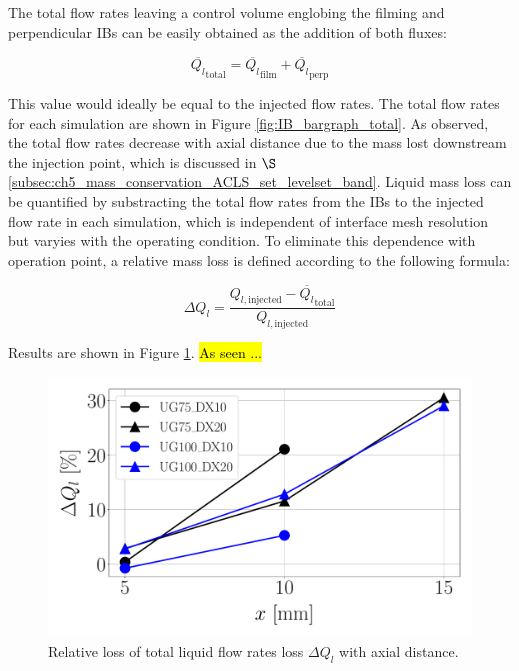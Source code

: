 The total flow rates leaving a control volume englobing the filming and perpendicular IBs can be easily obtained as the addition of both fluxes:

\begin{equation}
\overline{Q_l}_{\mathrm{total}} = \overline{Q_l}_{\mathrm{film}} + \overline{Q_l}_{\mathrm{perp}}
\end{equation}

This value would ideally be equal to the injected flow rates. The total flow rates for each simulation are shown in Figure \ref{fig:IB_bargraph_total}. As observed, the total flow rates decrease with axial distance due to the mass lost downstream the injection point, which is discussed in $\S$\ref{subsec:ch5_mass_conservation_ACLS_set_levelset_band}. Liquid mass loss can be quantified by substracting the total flow rates from the IBs to the injected flow rate in each simulation, which is independent of interface mesh resolution but varyies with the operating condition. To eliminate this dependence with operation point, a relative mass loss is defined according to the following formula:

\begin{equation}
\Delta Q_l = \frac{Q_{l,\mathrm{injected}} - \overline{Q_l}_{\mathrm{total}}}{Q_{l,\mathrm{injected}}}
\end{equation}

Results are shown in Figure \ref{fig:delta_Ql_with_x}. \hl{As seen ...}

\begin{figure}[ht]
	\centering
   \includegraphics[scale=0.25]{./part2_developments/figures_ch5_resolved_JICF/flow_rates_ibs/Ql_loss_with_x}
   \vspace*{-0.1in}
   \caption{Relative loss of total liquid flow rates loss $\Delta Q_l$ with axial distance.}
   \label{fig:delta_Ql_with_x}
\end{figure}


